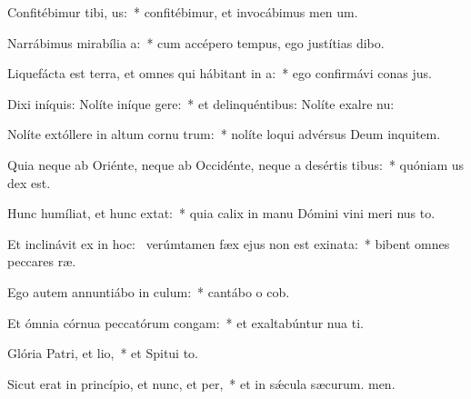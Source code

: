 \item Confitébimur tibi, us:~* confitébimur, et invocábimus men um.
\item Narrábimus mirabília a:~* cum accépero tempus, ego justítias dibo.
\item Liquefácta est terra, et omnes qui hábitant in a:~* ego confirmávi conas jus.
\item Dixi iníquis: Nolíte iníque gere:~* et delinquéntibus: Nolíte exalre nu:
\item Nolíte extóllere in altum cornu trum:~* nolíte loqui advérsus Deum inquitem.
\item Quia neque ab Oriénte, neque ab Occidénte, neque a desértis tibus:~* quóniam us dex est.
\item Hunc humíliat, et hunc extat:~* quia calix in manu Dómini vini meri nus to.
\item Et inclinávit ex  in hoc:~\pscross{} verúmtamen fæx ejus non est exinata:~* bibent omnes peccares ræ.
\item Ego autem annuntiábo in culum:~* cantábo o cob.
\item Et ómnia córnua peccatórum congam:~* et exaltabúntur nua ti.
\item Glória Patri, et lio,~* et Spitui to.
\item Sicut erat in princípio, et nunc, et per,~* et in sǽcula sæcurum. men.
